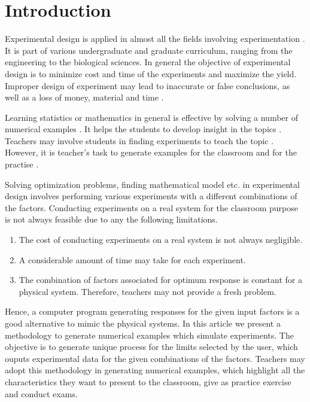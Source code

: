 \documentclass[twocolumn]{svjour3}          %
\begin{document}
\section{Introduction}
Experimental design is applied in almost all the fields involving experimentation \cite{fisher1937design,quinn2002experimental,montgomery2008design,antony2014design}. It is part of various undergraduate and graduate curriculum, ranging from the engineering to the biological sciences. In general the objective of experimental design is to minimize cost and time of the experiments and maximize the yield. Improper design of experiment may lead to inaccurate or false conclusions, as well as a loss of money, material and time \cite{Festing2003341}.
\par
Learning statistics or mathematics in general is effective by solving a number of numerical examples \cite{zhu1987learning}. It helps the students to develop insight in the topics \cite{renkl1997learning}. Teachers may involve students in finding experiments to teach the topic \cite{Hunter1977Some,fried2006mathematics,Hiebert82}. However, it is teacher's task to generate examples for the classroom and for the practise \cite{Deborah2008}.
\par
Solving optimization problems, finding mathematical model etc. in experimental design involves performing various experiments with a different combinations of the factors. Conducting experiments on a real system for the classroom purpose is not always feasible due to any the following limitations.
\begin{enumerate}
	\item The cost of conducting experiments on a real system is not always negligible.
	\item A considerable amount of time may take for each experiment.
	\item The combination of factors associated for optimum response is constant for a physical system. Therefore, teachers may not provide a fresh problem.
\end{enumerate}
\par
Hence, a computer program generating responses for the given input factors is a good alternative to mimic the physical systems. In this article we present a methodology to generate numerical examples which simulate experiments. The objective is to generate unique process for the limits selected by the user, which ouputs experimental data for the given combinations of the factors. Teachers may adopt this methodology in generating numerical examples, which highlight all the characteristics they want to present to the classroom, give as practice exercise and conduct exams.
\end{document}
